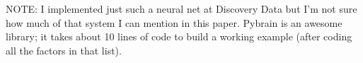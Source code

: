 \documentclass[11pt]{article}
\begin{document}
NOTE: I implemented just such a neural net at Discovery Data but I'm not sure how much of that system I can mention in this paper. Pybrain is an awesome library; it takes about 10 lines of code to build a working example (after coding all the factors in that list).

{}

\end{document}
